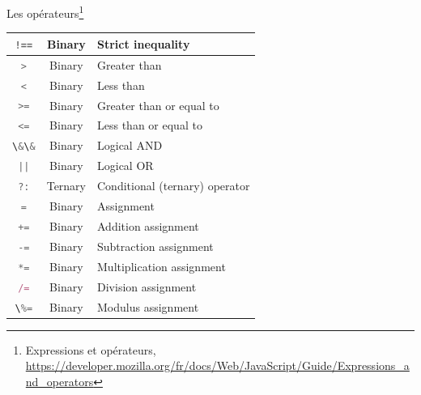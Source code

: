 \documentclass{beamer}
\begin{document}
\begin{frame}{Les opérateurs\footnote{\label{operators}Expressions et opérateurs, \url{https://developer.mozilla.org/fr/docs/Web/JavaScript/Guide/Expressions_and_operators}}}
\begin{tiny}
\begin{table}[h!]
\begin{tabular}{|c|c|p{8cm}|}
                \hline
                \lstinline[language=Javascript]|!==|  & Binary        & Strict inequality                \\
                \hline
                \lstinline[language=Javascript]!>!    & Binary        & Greater than                     \\
                \hline
                \lstinline[language=Javascript]!<!    & Binary        & Less than                        \\
                \hline
                \lstinline[language=Javascript]!>=!   & Binary        & Greater than or equal to         \\
                \hline
                \lstinline[language=Javascript]!<=!   & Binary        & Less than or equal to            \\
                \hline
                \lstinline[language=Javascript]!\&\&! & Binary        & Logical AND                      \\
                \hline
                \lstinline[language=Javascript]!||!   & Binary        & Logical OR                       \\
                \hline
                \lstinline[language=Javascript]!?:!   & Ternary       & Conditional (ternary) operator   \\
                \hline
                \lstinline[language=Javascript]!=!    & Binary        & Assignment                       \\
                \hline
                \lstinline[language=Javascript]!+=!   & Binary        & Addition assignment              \\
                \hline
                \lstinline[language=Javascript]!-=!   & Binary        & Subtraction assignment           \\
                \hline
                \lstinline[language=Javascript]!*=!   & Binary        & Multiplication assignment        \\
                \hline
                \lstinline[language=Javascript]!/=!   & Binary        & Division assignment              \\
                \hline
                \lstinline[language=Javascript]!\%=!  & Binary        & Modulus assignment               \\
                \hline
            \end{tabular}
        \end{table}
    \end{tiny}
\end{frame}
\end{document}
